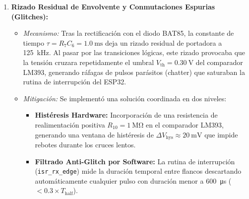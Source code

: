 \begin{enumerate}
    \begin{itemize}
        \item \textit{Mecanismo:} La actividad interna de los núcleos Xtensa a frecuencias de reloj de \SI{80}{\mega\hertz} o \SI{160}{\mega\hertz} provoca transitorios de corriente rápidos ($\sim \text{mA}/\text{ns}$) en los rieles de alimentación de \SI{3.3}{\volt}. Dado que la masa virtual ($V_{\text{ref}} = \SI{1.65}{\volt}$) se deriva de este mismo riel mediante un divisor resistivo ($2 \times \SI{100}{\kilo\ohm}$), el rizado digital modulaba el punto de operación común del preamplificador analógico.
        \item \textit{Mitigación:} Se robusteció el nodo de masa virtual incorporando un capacitor electrolítico de \SI{1.0}{\micro\farad} en paralelo con un capacitor cerámico de \SI{100}{\nano\farad}, reduciendo la impedancia de la masa virtual a alta frecuencia a una fracción de ohmio y eliminando el crosstalk digital-analógico.
    \end{itemize}
    \item \textbf{Rizado Residual de Envolvente y Conmutaciones Espurias (Glitches):}
    \begin{itemize}
        \item \textit{Mecanismo:} Tras la rectificación con el diodo BAT85, la constante de tiempo $\tau = R_7 C_6 = \SI{1.0}{\milli\second}$ deja un rizado residual de portadora a \SI{125}{\kilo\hertz}. Al pasar por las transiciones lógicas, este rizado provocaba que la tensión cruzara repetidamente el umbral $V_{\text{th}} = \SI{0.30}{\volt}$ del comparador LM393, generando ráfagas de pulsos parásitos (chatter) que saturaban la rutina de interrupción del ESP32.
        \item \textit{Mitigación:} Se implementó una solución coordinada en dos niveles:
        \begin{itemize}
            \item \textbf{Histéresis Hardware:} Incorporación de una resistencia de realimentación positiva $R_{10} = \SI{1}{\mega\ohm}$ en el comparador LM393, generando una ventana de histéresis de $\Delta V_{\text{hys}} \approx \SI{20}{\milli\volt}$ que impide rebotes durante los cruces lentos.
            \item \textbf{Filtrado Anti-Glitch por Software:} La rutina de interrupción (\texttt{isr\_rx\_edge}) mide la duración temporal entre flancos descartando automáticamente cualquier pulso con duración menor a \SI{600}{\micro\second} ($< 0.3 \times T_{\text{half}}$).
        \end{itemize}
    \end{itemize}
\end{enumerate}

